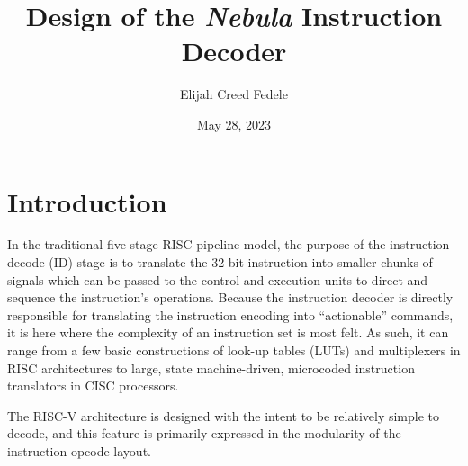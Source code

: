 \documentclass[a4paper,10pt,notitlepage]{article}
\title{Design of the \textit{Nebula} Instruction Decoder}
\author{{Elijah Creed Fedele}}
\date{May 28, 2023}
\begin{document}
	\maketitle
	
	\section{Introduction}
	
	In the traditional five-stage RISC pipeline model, the purpose of the instruction decode (ID) stage is to translate the 32-bit instruction into smaller chunks of signals which can be passed to the control and execution units to direct and sequence the instruction's operations. Because the instruction decoder is directly responsible for translating the instruction encoding into ``actionable'' commands, it is here where the complexity of an instruction set is most felt. As such, it can range from a few basic constructions of look-up tables (LUTs) and multiplexers in RISC architectures to large, state machine-driven, microcoded instruction translators in CISC processors.
	
	The RISC-V architecture is designed with the intent to be relatively simple to decode, and this feature is primarily expressed in the modularity of the instruction opcode layout. 
	
\end{document}
